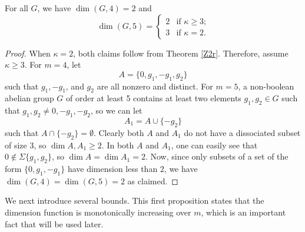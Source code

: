 \documentclass[ml]{ShepardPAPER}
\begin{document}
\begin{proposition}\label{45}
    For all $G$, we have $\dim(G,4)=2$ and
    \[\dim(G,5)=\begin{cases}
    2 & \text{if $\kappa\geq3$;}\\
    3 & \text{if $\kappa=2$.}
    \end{cases}\]
\end{proposition}
\begin{proof}
    When $\kappa=2$, both claims follow from Theorem \ref{Z2r}. Therefore, assume $\kappa\geq3$. 
    For $m=4$, let
    \[A = \{0, g_1, -g_1, g_2\}\]
    such that $g_1, -g_1$, and $g_2$ are all nonzero and distinct. For $m=5$, a non-boolean abelian group $G$ of order at least 5 contains at least two elements $g_1,g_2\in G$ such that $g_1,g_2\neq 0,-g_1,-g_2$, so we can let
    \[A_1= A\cup\{-g_2\}\]
    such that $A\cap\{-g_2\}=\emptyset$. Clearly both $A$ and $A_1$ do not have a dissociated subset of size 3, so $\dim A,A_1\geq 2$. In both $A$ and $A_1$, one can easily see that $0\notin\Sigma\{g_1,g_2\}$, so $\dim A =\dim A_1=2$. Now, since only subsets of a set of the form $\{0,g_1,-g_1\}$ have dimension less than 2, we have $\dim(G,4)=\dim(G,5)=2$ as claimed.
\end{proof}


We next introduce several bounds. This first proposition states that the dimension function is monotonically increasing over $m$, which is an important fact that will be used later.
\end{document}
